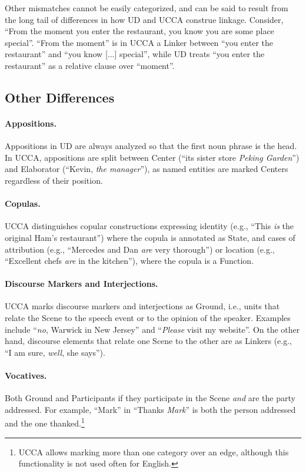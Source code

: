 \documentclass[11pt,a4paper]{article}
\begin{document}
Other mismatches cannot be easily categorized, and can be said to result from the long tail of differences in how UD and UCCA construe linkage.
Consider, ``From the moment you enter the restaurant, you know you are some place special''. ``From the moment'' is in UCCA
a Linker between ``you enter the restaurant'' and ``you know [...] special'', while UD treats ``you enter the restaurant'' as a relative
clause over ``moment''.


    

\subsection{Other Differences}\label{sec:misc}

\paragraph{Appositions.}
    Appositions in UD are always analyzed so that the first
    noun phrase is the head. 
    In UCCA, appositions are split between Center
    (``its sister store \textit{Peking Garden}'')
    and Elaborator (``Kevin, \textit{the manager}''),
    as named entities are marked Centers regardless of their position.

\paragraph{Copulas.}
    UCCA distinguishes copular constructions expressing
    identity (e.g., ``This \textit{is} the original Ham's restaurant'') where the copula is annotated as State,
    and cases of attribution 
    (e.g., ``Mercedes and Dan \textit{are} very thorough'')
    or location (e.g., ``Excellent chefs \textit{are} in the kitchen''),
    where the copula is a Function.

\paragraph{Discourse Markers and Interjections.}
    UCCA marks discourse markers and interjections as Ground, i.e., units that relate the Scene 
    to the speech event or to the opinion of the speaker. Examples include ``\textit{no}, Warwick in New Jersey'' and ``\textit{Please} visit my website''.
    On the other hand, discourse elements that relate one Scene to the other 
    are as Linkers (e.g., ``I am sure, \textit{well}, she says'').

\paragraph{Vocatives.}
    Both Ground and Participants if they participate in the Scene \textit{and} are the party addressed.
    For example, ``Mark'' in ``Thanks \textit{Mark}'' is both the person addressed and the one thanked.\footnote{UCCA allows marking more than one category over an edge, although this
    functionality is not used often for English.}
    
\end{document}
